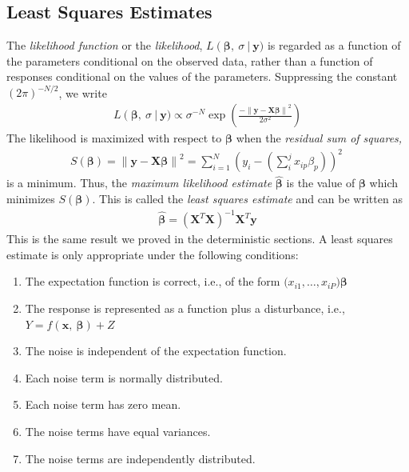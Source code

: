 \subsection{Least Squares Estimates}\label{least-squares-estimates}
The \emph{likelihood function} or the \emph{likelihood},
\(L\left( \boldsymbol{\beta},\ \sigma\  \right|\boldsymbol{\ y})\) is regarded
as a function of the parameters conditional on the observed data, rather
than a function of responses conditional on the values of the
parameters. Suppressing the constant \((2\pi)^{- N/2}\), we write
\begin{align}
L\left( \boldsymbol{\beta},\ \sigma\  \right|\boldsymbol{\ y}) \propto \sigma^{- N}\exp\left( \frac{- \left\| \boldsymbol{y} - \boldsymbol{X\beta} \right\|^{2}}{2\sigma^{2}} \right)
\end{align}
The likelihood is maximized with respect to \(\boldsymbol{\beta}\) when the
\emph{residual sum of squares,}
\begin{align}
S\left( \boldsymbol{\beta} \right) = \left\| \boldsymbol{y} - \boldsymbol{X\beta} \right\|^{2} = \sum_{i = 1}^{N}\left( y_{i} - \left( \sum_{i}^{j}{x_{ip}\beta_{p}} \right) \right)^{2}\ 
\end{align}
is a minimum. Thus, the \emph{maximum likelihood estimate}
\(\widehat{\boldsymbol{\beta}}\) is the value of \(\boldsymbol{\beta}\) which
minimizes \(S\left( \boldsymbol{\beta} \right)\). This is called the
\emph{least squares estimate} and can be written as
\begin{align}
\widehat{\boldsymbol{\beta}} = \left( \boldsymbol{X}^{T}\boldsymbol{X} \right)^{- 1}\boldsymbol{X}^{T}\boldsymbol{y}
\end{align}
This is the same result we proved in the deterministic sections.
A least squares estimate is only appropriate under the following
conditions:
\begin{enumerate}
\def\labelenumi{\arabic{enumi}.}
\item
  The expectation function is correct, i.e., of the form
  \((x_{i1}\boldsymbol{,\ldots,}x_{iP}\boldsymbol{)\beta}\)
\item
  The response is represented as a function plus a disturbance, i.e.,
  \(Y = f\left( \boldsymbol{x},\ \boldsymbol{\beta} \right) + Z\)
\item
  The noise is independent of the expectation function.
\item
  Each noise term is normally distributed.
\item
  Each noise term has zero mean.
\item
  The noise terms have equal variances.
\item
  The noise terms are independently distributed.
\end{enumerate}

